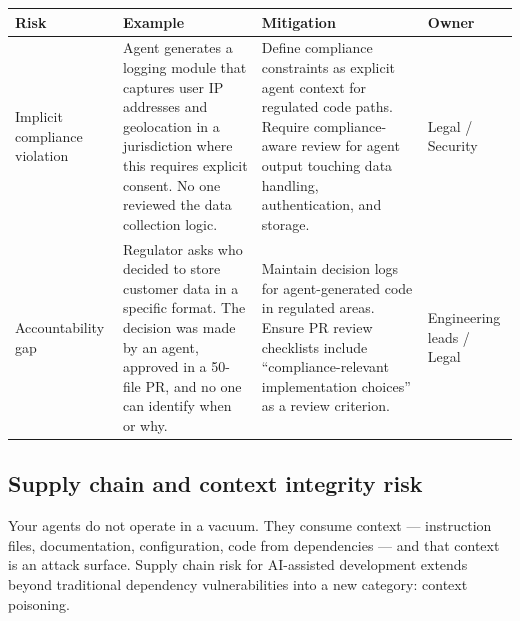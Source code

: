 \documentclass[
  a4paper,
  DIV=11,
  numbers=noendperiod]{scrreprt}
\newcounter{none} %
\begin{document}
{\def\LTcaptype{none} %
\begin{longtable}[]{@{}
  >{\raggedright\arraybackslash}p{}
  >{\raggedright\arraybackslash}p{}
  >{\raggedright\arraybackslash}p{}
  >{\raggedright\arraybackslash}p{}@{}}
\toprule\noalign{}
\begin{minipage}[b]{\linewidth}\raggedright
Risk
\end{minipage} & \begin{minipage}[b]{\linewidth}\raggedright
Example
\end{minipage} & \begin{minipage}[b]{\linewidth}\raggedright
Mitigation
\end{minipage} & \begin{minipage}[b]{\linewidth}\raggedright
Owner
\end{minipage} \\
\midrule\noalign{}
\endhead
\bottomrule\noalign{}
\endlastfoot
Implicit compliance violation & Agent generates a logging module that
captures user IP addresses and geolocation in a jurisdiction where this
requires explicit consent. No one reviewed the data collection logic. &
Define compliance constraints as explicit agent context for regulated
code paths. Require compliance-aware review for agent output touching
data handling, authentication, and storage. & Legal / Security \\
Accountability gap & Regulator asks who decided to store customer data
in a specific format. The decision was made by an agent, approved in a
50-file PR, and no one can identify when or why. & Maintain decision
logs for agent-generated code in regulated areas. Ensure PR review
checklists include ``compliance-relevant implementation choices'' as a
review criterion. & Engineering leads / Legal \\
\end{longtable}
}

\subsection{Supply chain and context integrity
risk}\label{supply-chain-and-context-integrity-risk}

Your agents do not operate in a vacuum. They consume context ---
instruction files, documentation, configuration, code from dependencies
--- and that context is an attack surface. Supply chain risk for
AI-assisted development extends beyond traditional dependency
vulnerabilities into a new category: context poisoning.
\end{document}
